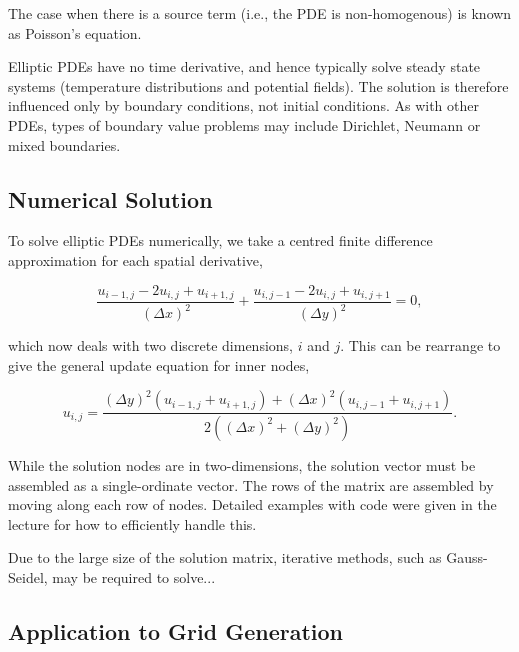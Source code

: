 \documentclass[12pt]{article}
\begin{document}
\vspace{4mm}

The case when there is a source term (i.e., the PDE is non-homogenous) is known as Poisson's equation.

\vspace{4mm}

Elliptic PDEs have no time derivative, and hence typically solve steady state systems (temperature distributions and potential fields). The solution is therefore influenced only by boundary conditions, not initial conditions. As with other PDEs, types of boundary value problems may include Dirichlet, Neumann or mixed boundaries.

\subsection{Numerical Solution}

To solve elliptic PDEs numerically, we take a centred finite difference approximation for each spatial derivative,

\vspace{2mm}

$$ \frac{u_{i-1,j} - 2u_{i,j} + u_{i+1,j}}{(\Delta x)^2} + \frac{u_{i,j-1} - 2u_{i,j} + u_{i,j+1}}{(\Delta y)^2} = 0,$$

\vspace{4mm}

which now deals with two discrete dimensions, $i$ and $j$. This can be rearrange to give the general update equation for inner nodes,

\vspace{2mm}

$$ u_{i,j} = \frac{(\Delta y)^2 (u_{i-1,j}+u_{i+1,j}) + (\Delta x)^2 (u_{i,j-1}+u_{i,j+1})}{2((\Delta x)^2 + (\Delta y)^2)}. $$

\vspace{4mm}

While the solution nodes are in two-dimensions, the solution vector must be assembled as a single-ordinate vector. The rows of the matrix are assembled by moving along each row of nodes. Detailed examples with code were given in the lecture for how to efficiently handle this.

\vspace{4mm}

Due to the large size of the solution matrix, iterative methods, such as Gauss-Seidel, may be required to solve...

\subsection{Application to Grid Generation}
\end{document}
